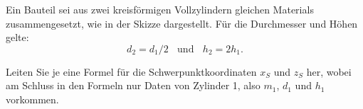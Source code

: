 \begin{ExerciseBlock}
Ein Bauteil sei aus zwei kreisförmigen Vollzylindern
gleichen Materials zusammengesetzt, wie in der Skizze
dargestellt. Für die Durchmesser und Höhen gelte:
\[ d_2=d_1/2 \ \ \ \ \text{und} \ \ \ \ h_2 =2 h_1 .\]

Leiten Sie je eine Formel für die Schwerpunktkoordinaten
$x_S$ und $z_S$ her, wobei am Schluss in den Formeln nur
Daten von Zylinder 1, also $m_1$, $d_1$ und $h_1$ vorkommen.

\begin{center}
\end{center}
\end{ExerciseBlock}
